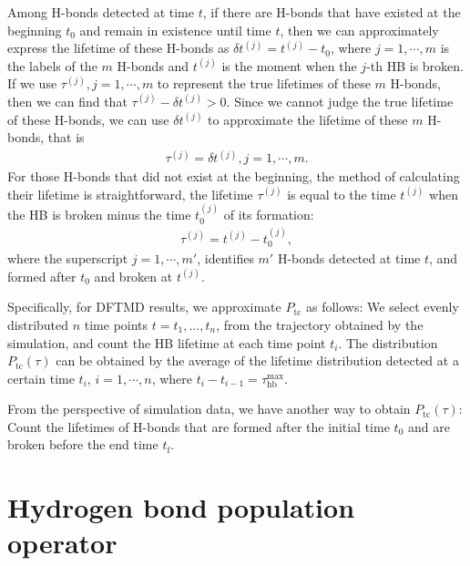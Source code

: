 {Among H-bonds detected at time $t$, if there are H-bonds that have existed at the beginning $t_0$ and 
remain in existence until time $t$, then we can approximately express the lifetime of these H-bonds as $\delta t^{(j)}=t^{(j)} -t_0$, 
where $j=1,\cdots, m$ is the labels of the $m$ H-bonds and $t^{(j)}$ is the moment when the $j$-th HB is broken. 
If we use $\tau^{(j)},j=1,\cdots,m$ to represent the true lifetimes of these $m$ H-bonds,
then we can find that $\tau^{(j)}-\delta t^{(j)} >0 $.
Since we cannot judge the true lifetime of these H-bonds, we can use $\delta t^{(j)}$ to approximate 
the lifetime of these $m$ H-bonds, that is
\begin{eqnarray}
\tau^{(j)} = \delta t^{(j)}, j=1,\cdots,m.
\end{eqnarray}
For those H-bonds that did not exist at the beginning, the method of calculating their lifetime is straightforward, 
the lifetime $\tau^{(j)}$ is equal to the time $t^{(j)}$ when the HB is broken minus the time $t^{{(j)}}_0$ of its formation:
\begin{eqnarray}
\tau^{(j)} = t^{(j)} - t^{(j)}_0,
\end{eqnarray} 
where the superscript $j = 1, \cdots, m'$, identifies $m'$ H-bonds 
detected at time $t$, and
formed after $t_0$ and broken at $t^{(j)}$.

Specifically, for DFTMD results, we approximate $P_\text{tc}$ as follows: 
We select evenly distributed $n$ time points $t=t_1,...,t_n$, from the trajectory obtained by the simulation, 
and count the HB lifetime at each time point $t_i$.
The distribution $P_\text{tc}(\tau)$ 
can be obtained by the average of the lifetime distribution detected at a certain time $t_i$, $i=1,\cdots, n$, 
where $t_i-t_{i-1} = \tau_\text{hb}^{\max}$. 

From the perspective of simulation data, we have another way to obtain $P_\text{tc}(\tau)$: 
Count the lifetimes of H-bonds that are formed after the initial time $t_0$ and are broken before the end time $t_\text{f}$.

\section{Hydrogen bond population operator}\label{hbpo}
}
